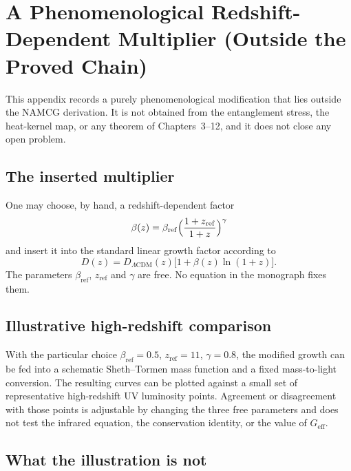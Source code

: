 \chapter{A Phenomenological Redshift-Dependent Multiplier (Outside the Proved Chain)}
\label{app:dynamic_coupling}

This appendix records a purely phenomenological modification that
lies outside the NAMCG derivation. It is not obtained from the
entanglement stress, the heat-kernel map, or any theorem of
Chapters~3--12, and it does not close any open problem.

\section{The inserted multiplier}
\label{sec:pheno-multiplier}

One may choose, by hand, a redshift-dependent factor
\begin{equation}
  \beta(z)=\beta_{\mathrm{ref}}
  \Bigl(\frac{1+z_{\mathrm{ref}}}{1+z}\Bigr)^\gamma
\end{equation}
and insert it into the standard linear growth factor according to
\begin{equation}
  D(z)=D_{\Lambda\mathrm{CDM}}(z)
  \bigl[1+\beta(z)\ln(1+z)\bigr].
\end{equation}
The parameters \(\beta_{\mathrm{ref}}\), \(z_{\mathrm{ref}}\) and
\(\gamma\) are free. No equation in the monograph fixes them.

\section{Illustrative high-redshift comparison}
\label{sec:pheno-jwst}

With the particular choice
\(\beta_{\mathrm{ref}}=0.5\), \(z_{\mathrm{ref}}=11\), \(\gamma=0.8\),
the modified growth can be fed into a schematic Sheth--Tormen
mass function and a fixed mass-to-light conversion. The resulting
curves can be plotted against a small set of representative
high-redshift UV luminosity points. Agreement or disagreement with
those points is adjustable by changing the three free parameters
and does not test the infrared equation, the conservation identity,
or the value of \(G_{\mathrm{eff}}\).

\section{What the illustration is not}
\label{sec:pheno-not}


